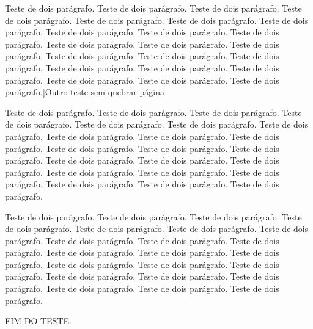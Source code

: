 \documentclass[12pt]{article}
\begin{document}
Teste de dois parágrafo. Teste de dois parágrafo. Teste de dois parágrafo. Teste de dois parágrafo. Teste de dois parágrafo. Teste de dois parágrafo. Teste de dois parágrafo. Teste de dois parágrafo. Teste de dois parágrafo. Teste de dois parágrafo. Teste de dois parágrafo. Teste de dois parágrafo. Teste de dois parágrafo. Teste de dois parágrafo. Teste de dois parágrafo. Teste de dois parágrafo. Teste de dois parágrafo. Teste de dois parágrafo. Teste de dois parágrafo. Teste de dois parágrafo. Teste de dois parágrafo. Teste de dois parágrafo.]{Outro teste sem quebrar página}

Teste de dois parágrafo. Teste de dois parágrafo. Teste de dois parágrafo. Teste de dois parágrafo. Teste de dois parágrafo. Teste de dois parágrafo. Teste de dois parágrafo. Teste de dois parágrafo. Teste de dois parágrafo. Teste de dois parágrafo. Teste de dois parágrafo. Teste de dois parágrafo. Teste de dois parágrafo. Teste de dois parágrafo. Teste de dois parágrafo. Teste de dois parágrafo. Teste de dois parágrafo. Teste de dois parágrafo. Teste de dois parágrafo. Teste de dois parágrafo. Teste de dois parágrafo. Teste de dois parágrafo.

Teste de dois parágrafo. Teste de dois parágrafo. Teste de dois parágrafo. Teste de dois parágrafo. Teste de dois parágrafo. Teste de dois parágrafo. Teste de dois parágrafo. Teste de dois parágrafo. Teste de dois parágrafo. Teste de dois parágrafo. Teste de dois parágrafo. Teste de dois parágrafo. Teste de dois parágrafo. Teste de dois parágrafo. Teste de dois parágrafo. Teste de dois parágrafo. Teste de dois parágrafo. Teste de dois parágrafo. Teste de dois parágrafo. Teste de dois parágrafo. Teste de dois parágrafo. Teste de dois parágrafo.



FIM DO TESTE.
\end{document}
